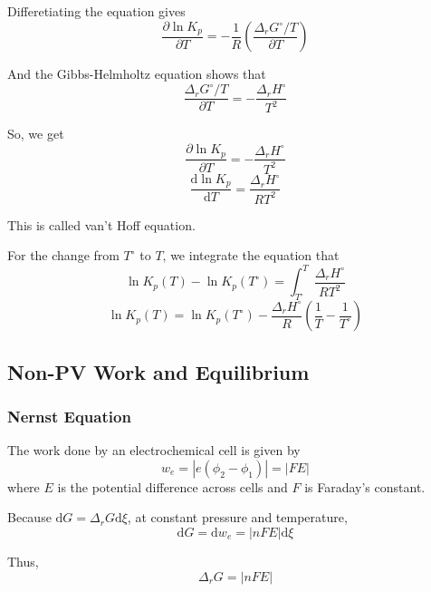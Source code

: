 \documentclass[letterpaper]{article}
\newcommand{\diff}{\mathrm{d}}
\newcommand{\zero}{^\circ}
\begin{document}
Differetiating the equation gives
\begin{equation*}
    \frac{\partial\ln K_p}{\partial T}=-\frac{1}{R}\left(\frac{\Delta_rG\zero/T}{\partial T}\right)
\end{equation*}

And the Gibbs-Helmholtz equation shows that
\begin{equation*}
    \frac{\Delta_rG\zero/T}{\partial T}=-\frac{\Delta_rH\zero}{T^2}
\end{equation*}

So, we get
\begin{equation*}
    \frac{\partial\ln K_p}{\partial T}=-\frac{\Delta_rH\zero}{T^2}
\end{equation*}
\begin{equation*}
    \boxed{\frac{\diff\ln K_p}{\diff T}=\frac{\Delta_rH\zero}{RT^2}}
\end{equation*}

This is called van't Hoff equation.

For the change from $T\zero$ to $T$, we integrate the equation that
\begin{equation*}
    \ln K_p(T)-\ln K_p(T\zero)=\int_{T\zero}^{T}\frac{\Delta_rH\zero}{RT^2}
\end{equation*}
\begin{equation*}
    \boxed{\ln K_p(T)=\ln K_p(T\zero)-\frac{\Delta_rH\zero}{R}\left(\frac{1}{T}-\frac{1}{T\zero}\right)}
\end{equation*}
\subsection*{Non-PV Work and Equilibrium}
\subsubsection*{Nernst Equation}
The work done by an electrochemical cell is given by
\begin{equation*}
    w_e=|e(\phi_2-\phi_1)|=|FE|
\end{equation*}
where $E$ is the potential difference across cells and $F$ is Faraday's constant.

Because $\diff G=\Delta_rG\diff \xi$, at constant pressure and temperature,
\begin{equation*}
    \diff G=\diff w_e=|nFE|\diff\xi
\end{equation*}

Thus,
\begin{equation*}
    \Delta_rG=|nFE|
\end{equation*}
\end{document}

